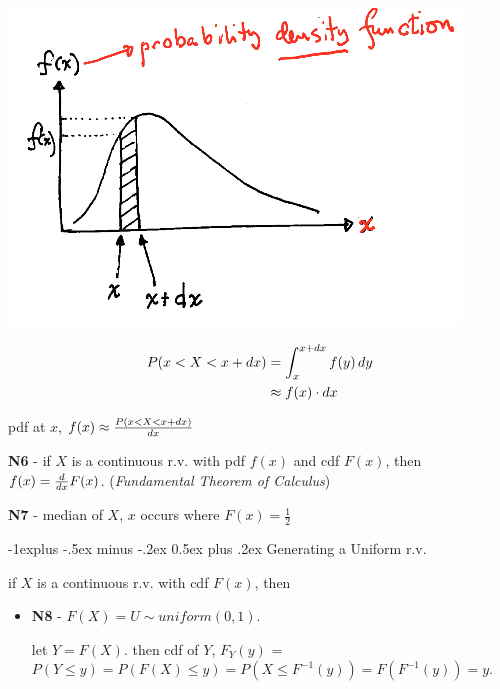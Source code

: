 \documentclass[10pt, landscape]{article}
\makeatletter
\renewcommand{\subsection}{\@startsection{subsection}{2}{0mm}%
  {-1explus -.5ex minus -.2ex}%
  {0.5ex plus .2ex}%
{\normalfont\normalsize\bfseries}}
\makeatother
\begin{document}
\begin{multicols*}{3}
  \begin{minipage}[c]{0.4\linewidth}
    \includegraphics[width=0.9\linewidth]{st2131-pdf.png} 
  \end{minipage}
  \begin{minipage}[c]{0.55\linewidth}
    \begin{align*}
      P(x < X < x + \mathop{dx}) &= \int^{x+\mathop{dx}}_x f(y) \mathop{dy} 
                      \\ &\approx f(x) \cdot \mathop{dx}
    \end{align*}

    pdf at $x$, $f(x) \approx \frac{P(x < X < x + \mathop{dx})}{\mathop{dx}}$
  \end{minipage}

  \textbf{N6} - if $X$ is a continuous r.v. with pdf $f(x)$ and cdf $F(x)$, then $f(x) = \frac{d}{\mathop{dx}}F(x)$. (\textit{Fundamental Theorem of Calculus})

  \textbf{N7} - median of $X$, $x$ occurs where $F(x) = \frac{1}{2}$ 

  \subsection{Generating a Uniform r.v.}

  if $X$ is a continuous r.v. with cdf $F(x)$, then 

  \begin{itemize}
    \item \textbf{N8} - $F(X) = U \sim uniform(0, 1)$.

      \begin{niceproof}
        let $Y = F(X)$. then cdf of $Y$, $F_Y(y)$ = $P(Y \leq y) = P(F(X) \leq y) = P(X \leq F^{-1}(y)) = F(F^{-1}(y)) = y $.
      \end{niceproof}


\end{itemize}
\end{multicols*}
\end{document}
